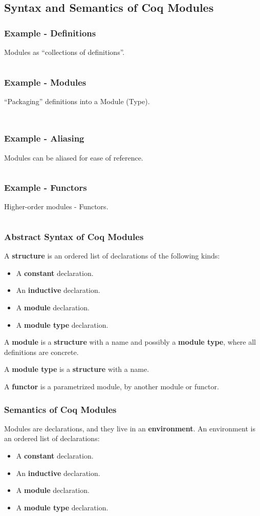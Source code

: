 \subsection{Syntax and Semantics of Coq Modules}
\begin{frame}
  \frametitle{Example - Definitions}
  Modules as ``collections of definitions''.
  \inputminted[firstline=1,lastline=10]{coq}{code/module_example.v}
\end{frame}

\begin{frame}
  \frametitle{Example - Modules}
  ``Packaging'' definitions into a Module (Type).
  \inputminted[firstline=11,lastline=16]{coq}{code/module_example.v}
  \inputminted[firstline=19,lastline=23]{coq}{code/module_example.v}
\end{frame}

\begin{frame}
  \frametitle{Example - Aliasing}
  Modules can be aliased for ease of reference.
  \inputminted[firstline=24,lastline=25]{coq}{code/module_example.v}
\end{frame}

\begin{frame}
  \frametitle{Example - Functors}
  Higher-order modules - Functors.
  \inputminted[firstline=27]{coq}{code/module_example.v}
\end{frame}

\begin{frame}
  \frametitle{Abstract Syntax of Coq Modules}
  A \textbf{structure} is an ordered list of declarations of the following
  kinds:
  \begin{itemize}
    \item A \textbf{constant} declaration.
    \item An \textbf{inductive} declaration.
    \item A \textbf{module} declaration.
    \item A \textbf{module type} declaration.
  \end{itemize}\pause
  A \textbf{module} is a \textbf{structure} with a name and possibly a
  \textbf{module type}, where all definitions are concrete.\pause
  
  A \textbf{module type} is a \textbf{structure} with a name.\pause

  A \textbf{functor} is a parametrized module, by another module or functor.
\end{frame}

\begin{frame}
  \frametitle{Semantics of Coq Modules}
  Modules are declarations, and they live in an \textbf{environment}. An
  environment is an ordered list of declarations:
  \begin{itemize}
    \item A \textbf{constant} declaration.
    \item An \textbf{inductive} declaration.
    \item A \textbf{module} declaration.
    \item A \textbf{module type} declaration.
  \end{itemize}
\end{frame}

